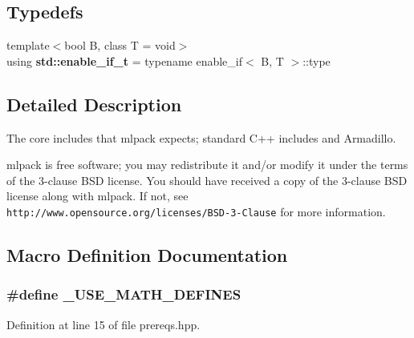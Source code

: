 \subsection*{Typedefs}
\begin{DoxyCompactItemize}
\item 
{\footnotesize template$<$bool B, class T  = void$>$ }\\using {\bf std\+::enable\+\_\+if\+\_\+t} = typename enable\+\_\+if$<$ B, T $>$\+::type
\end{DoxyCompactItemize}


\subsection{Detailed Description}
The core includes that mlpack expects; standard C++ includes and Armadillo. 

mlpack is free software; you may redistribute it and/or modify it under the terms of the 3-\/clause B\+SD license. You should have received a copy of the 3-\/clause B\+SD license along with mlpack. If not, see {\tt http\+://www.\+opensource.\+org/licenses/\+B\+S\+D-\/3-\/\+Clause} for more information. 

\subsection{Macro Definition Documentation}
\subsubsection[{\+\_\+\+U\+S\+E\+\_\+\+M\+A\+T\+H\+\_\+\+D\+E\+F\+I\+N\+ES}]{\setlength{\rightskip}{0pt plus 5cm}\#define \+\_\+\+U\+S\+E\+\_\+\+M\+A\+T\+H\+\_\+\+D\+E\+F\+I\+N\+ES}\label{prereqs_8hpp_a525335710b53cb064ca56b936120431e}


Definition at line 15 of file prereqs.\+hpp.

